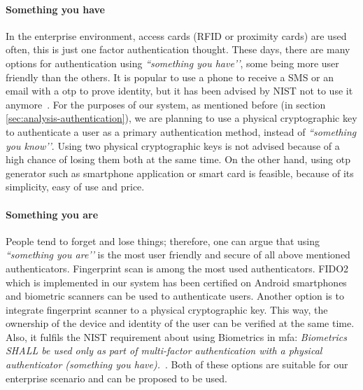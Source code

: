 \paragraph{Something you have}
In the enterprise environment, access cards (RFID or proximity cards) are used often, this is just one factor authentication thought. These days, there are many options for authentication using \textit{``something you have’’}, some being more user friendly than the others. It is popular to use a phone to receive a SMS or an email with a \acrfull{otp} to prove identity, but it has been advised by NIST not to use it anymore~\cite{NIST2017NISTBlog}. For the purposes of our system, as mentioned before (in section \ref{sec:analysis-authentication}), we are planning to use a physical cryptographic key to authenticate a user as a primary authentication method, instead of \textit{``something you know’’}. Using two physical cryptographic keys is not advised because of a high chance of losing them both at the same time. On the other hand, using \acrshort{otp} generator such as smartphone application or smart card is feasible, because of its simplicity, easy of use and price. 

\paragraph{Something you are}
People tend to forget and lose things; therefore, one can argue that using \textit{``something you are’’} is the most user friendly and secure of all above mentioned authenticators. Fingerprint scan is among the most used authenticators. FIDO2 which is implemented in our system has been certified on Android smartphones and biometric scanners can be used to authenticate users. Another option is to integrate fingerprint scanner to a physical cryptographic key. This way, the ownership of the device and identity of the user can be verified at the same time. Also, it fulfils the NIST requirement about using Biometrics in \acrshort{mfa}: \textit{Biometrics SHALL be used only as part of multi-factor authentication with a physical authenticator (something you have).}~\cite{Grassi2017DigitalManagement}. Both of these options are suitable for our enterprise scenario and can be proposed to be used.

